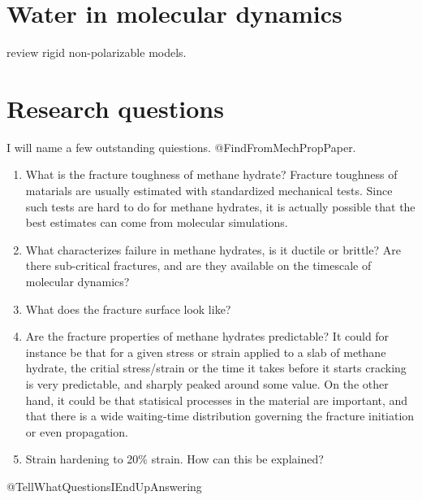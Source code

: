 \section{Water in molecular dynamics}
\citet{Vega2011} review rigid non-polarizable models.

\section{Research questions}
I will name a few outstanding quiestions. @FindFromMechPropPaper.


\begin{enumerate}
\item What is the fracture toughness of methane hydrate? Fracture toughness of matarials are usually estimated with standardized mechanical tests. Since such tests are hard to do for methane hydrates, it is actually possible that the best estimates can come from molecular simulations. 
\item What characterizes failure in methane hydrates, is it ductile or brittle? Are there sub-critical fractures, and are they available on the timescale of molecular dynamics?
\item What does the fracture surface look like?
\item Are the fracture properties of methane hydrates predictable? It could for instance be that for a given stress or strain applied to a slab of methane hydrate, the critial stress/strain or the time it takes before it starts cracking is very predictable, and sharply peaked around some value. On the other hand, it could be that statisical processes in the material are important, and that there is a wide waiting-time distribution governing the fracture initiation or even propagation.
\item Strain hardening to 20\% strain. How can this be explained?
\end{enumerate}

@TellWhatQuestionsIEndUpAnswering